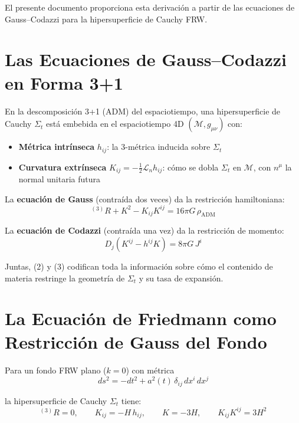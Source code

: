 \documentclass[12pt,a4paper]{article}
\begin{document}
El presente documento proporciona esta derivación a partir de las ecuaciones de Gauss--Codazzi para la hipersuperficie de Cauchy FRW.

\section{Las Ecuaciones de Gauss--Codazzi en Forma 3+1}

En la descomposición 3+1 (ADM) del espaciotiempo, una hipersuperficie de Cauchy $\Sigma_t$ está embebida en el espaciotiempo 4D $(\mathcal{M}, g_{\mu\nu})$ con:

\begin{itemize}
  \item \textbf{Métrica intrínseca} $h_{ij}$: la 3-métrica inducida sobre $\Sigma_t$
  \item \textbf{Curvatura extrínseca} $K_{ij} = -\frac{1}{2}\mathcal{L}_n h_{ij}$: cómo se dobla $\Sigma_t$ en $\mathcal{M}$, con $n^\mu$ la normal unitaria futura
\end{itemize}

La \textbf{ecuación de Gauss} (contraída dos veces) da la restricción hamiltoniana:
\begin{equation}
{}^{(3)}R + K^2 - K_{ij}K^{ij} = 16\pi G\,\rho_\text{ADM} \tag{2}
\end{equation}

La \textbf{ecuación de Codazzi} (contraída una vez) da la restricción de momento:
\begin{equation}
D_j\!\left(K^{ij} - h^{ij}K\right) = 8\pi G\,J^i \tag{3}
\end{equation}

Juntas, (2) y (3) codifican toda la información sobre cómo el contenido de materia restringe la geometría de $\Sigma_t$ y su tasa de expansión.

\section{La Ecuación de Friedmann como Restricción de Gauss del Fondo}

Para un fondo FRW plano ($k=0$) con métrica
\begin{equation}
ds^2 = -dt^2 + a^2(t)\,\delta_{ij}\,dx^i\,dx^j \tag{4}
\end{equation}

la hipersuperficie de Cauchy $\Sigma_t$ tiene:
\begin{equation}
{}^{(3)}R = 0, \qquad K_{ij} = -H\,h_{ij}, \qquad K = -3H, \qquad K_{ij}K^{ij} = 3H^2 \tag{5}
\end{equation}
\end{document}

